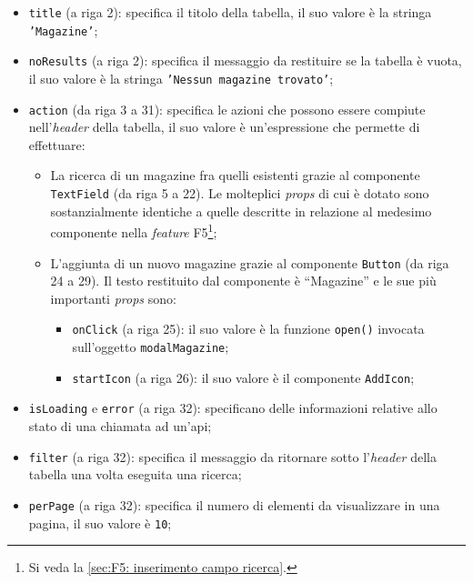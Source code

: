 \begin{itemize}
    \item \texttt{title} (a riga 2): specifica il titolo della tabella, il suo valore è la stringa \texttt{'Magazine'};
    
    \item \texttt{noResults} (a riga 2): specifica il messaggio da restituire se la tabella è vuota, il suo valore è la stringa \texttt{'Nessun magazine trovato'};
    
    \item \texttt{action} (da riga 3 a 31): specifica le azioni che possono essere compiute nell'\textit{header} della tabella, il suo valore è un'espressione che permette di effettuare:
        \begin{itemize}
            \item La ricerca di un magazine fra quelli esistenti grazie al componente \texttt{TextField} (da riga 5 a 22). Le molteplici \textit{props} di cui è dotato sono sostanzialmente identiche a quelle descritte in relazione al medesimo componente nella \textit{feature} F5\footnote{Si veda la \autoref{sec:F5: inserimento campo ricerca}.};
            
            \item L'aggiunta di un nuovo magazine grazie al componente \texttt{Button} (da riga 24 a 29). Il testo restituito dal componente è “Magazine” e le sue più importanti \textit{props} sono:
            \begin{itemize}
                \item \texttt{onClick} (a riga 25): il suo valore è la funzione \texttt{open()} invocata sull'oggetto \texttt{modalMagazine};
                
                \item \texttt{startIcon} (a riga 26): il suo valore è il componente \texttt{AddIcon};
            \end{itemize}
        \end{itemize}
    
    \item \texttt{isLoading} e \texttt{error} (a riga 32): specificano delle informazioni relative allo stato di una chiamata ad un'\gls{api};
     
    \item \texttt{filter} (a riga 32): specifica il messaggio da ritornare sotto l'\textit{header} della tabella una volta eseguita una ricerca;
    
    \item \texttt{perPage} (a riga 32): specifica il numero di elementi da visualizzare in una pagina, il suo valore è \texttt{10};
    

\end{itemize}
